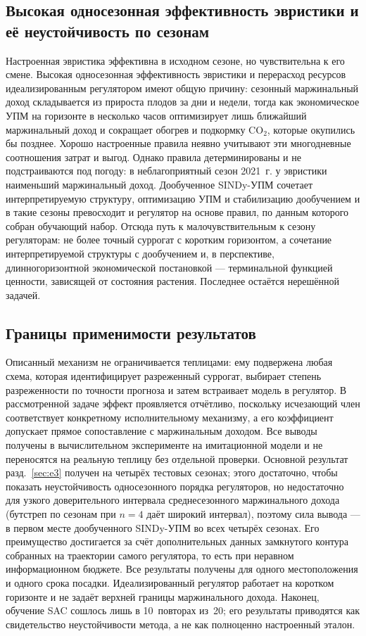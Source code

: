 \documentclass[12pt,a4paper,leqno]{article}
\begin{document}
\subsection{Высокая односезонная эффективность эвристики и её неустойчивость по сезонам}
Настроенная эвристика эффективна в исходном сезоне, но чувствительна к его смене.
Высокая односезонная эффективность эвристики и перерасход ресурсов идеализированным регулятором имеют
общую причину: сезонный маржинальный доход складывается из прироста плодов за дни и недели, тогда как
экономическое УПМ на горизонте в несколько часов оптимизирует лишь ближайший маржинальный доход и
сокращает обогрев и подкормку CO$_2$, которые окупились бы позднее. Хорошо настроенные
правила неявно учитывают эти многодневные соотношения затрат и выгод. Однако правила
детерминированы и не подстраиваются под погоду: в неблагоприятный сезон 2021~г. у эвристики
наименьший маржинальный доход. Дообученное SINDy-УПМ сочетает интерпретируемую структуру, оптимизацию
УПМ и стабилизацию дообучением и в такие сезоны превосходит и регулятор на основе правил,
по данным которого собран обучающий набор. Отсюда путь к малочувствительным к сезону регуляторам: не более
точный суррогат с коротким горизонтом, а сочетание интерпретируемой структуры с дообучением и,
в перспективе, длинногоризонтной экономической постановкой — терминальной функцией
ценности, зависящей от состояния растения. Последнее остаётся нерешённой задачей.

\subsection{Границы применимости результатов}
Описанный механизм не ограничивается теплицами: ему подвержена любая схема, которая
идентифицирует разреженный суррогат, выбирает степень разреженности по точности
прогноза и затем встраивает модель в регулятор. В рассмотренной задаче эффект
проявляется отчётливо, поскольку исчезающий член соответствует конкретному
исполнительному механизму, а его коэффициент допускает прямое сопоставление с маржинальным доходом. Все выводы получены в вычислительном
эксперименте на имитационной модели и не переносятся на реальную теплицу без отдельной
проверки. Основной результат разд.~\ref{sec:e3} получен на четырёх тестовых сезонах;
этого достаточно, чтобы показать неустойчивость односезонного порядка регуляторов, но
недостаточно для узкого доверительного интервала среднесезонного маржинального дохода (бутстреп по
сезонам при $n=4$ даёт широкий интервал), поэтому сила вывода — в первом месте
дообученного SINDy-УПМ во всех четырёх сезонах. Его преимущество достигается за
счёт дополнительных данных замкнутого контура собранных на траектории самого регулятора, то есть
при неравном информационном бюджете. Все результаты получены для одного местоположения и
одного срока посадки. Идеализированный регулятор работает на коротком горизонте и не
задаёт верхней границы маржинального дохода. Наконец, обучение SAC сошлось лишь в 10~повторах из~20;
его результаты приводятся как свидетельство неустойчивости метода, а не как полноценно
настроенный эталон.
\end{document}
